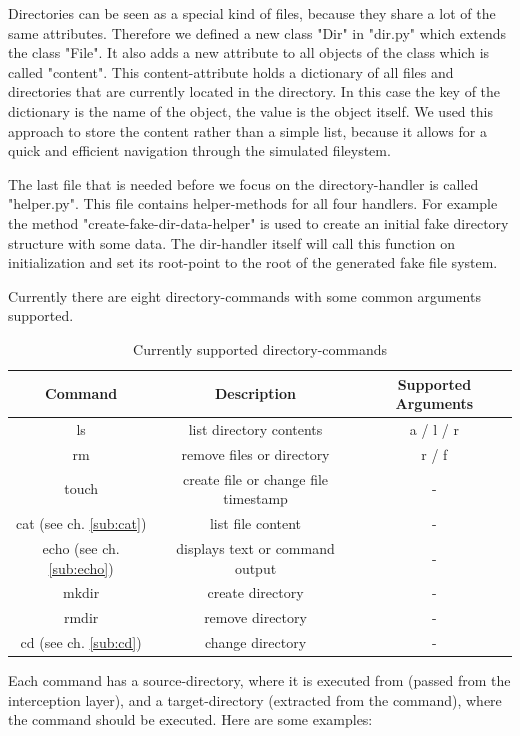 Directories can be seen as a special kind of files, because they share a lot of the same attributes.
Therefore we defined a new class "Dir" in "dir.py" which extends the class "File".
It also adds a new attribute to all objects of the class which is called "content".
This content-attribute holds a dictionary of all files and directories that are currently located in the directory.
In this case the key of the dictionary is the name of the object, the value is the object itself.
We used this approach to store the content rather than a simple list, because it allows for a quick and efficient navigation through the simulated fileystem. 

The last file that is needed before we focus on the directory-handler is called "helper.py".
This file contains helper-methods for all four handlers.
For example the method "create-fake-dir-data-helper" is used to create an initial fake directory structure with some data.
The dir-handler itself will call this function on initialization and set its root-point to the root of the generated fake file system.

Currently there are eight directory-commands with some common arguments supported.

\begin{table}[H]
    \centering
    \begin{tabular}{c|c|c}
        Command & Description & Supported Arguments\\
        \hline 
        ls & list directory contents & a / l / r\\
        rm & remove files or directory & r / f\\
        touch & create file or change file timestamp & -\\
        cat (see ch. \ref{sub:cat}) & list file content & -\\
        echo (see ch. \ref{sub:echo}) & displays text or command output & -\\
        mkdir & create directory & -\\
        rmdir & remove directory & -\\
        cd (see ch. \ref{sub:cd}) & change directory & -\\
    \end{tabular}
    \caption{Currently supported directory-commands}
    \label{tab:my_label}
\end{table}

Each command has a source-directory, where it is executed from (passed from the interception layer), and a target-directory (extracted from the command), where the command should be executed. Here are some examples:

